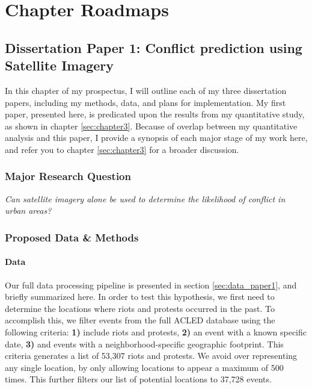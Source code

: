 
\chapter{Chapter Roadmaps} %


\label{Chapter4} %


\section{Dissertation Paper 1: Conflict prediction using Satellite Imagery}\label{sec:ch4_paper1}
In this chapter of my prospectus, I will outline each of my three dissertation papers, including my methods, data, and plans for implementation.  My first paper, presented here, is predicated upon the results from my quantitative study, as shown in chapter \ref{sec:chapter3}.  Because of overlap between my quantitative analysis and this paper, I provide a synopsis of each major stage of my work here, and refer you to chapter \ref{sec:chapter3} for a broader discussion.

\subsection{Major Research Question}
\textit{Can satellite imagery alone be used to determine the likelihood of conflict in urban areas?}

\subsection{Proposed Data \& Methods}
\subsubsection{Data}\label{sec:ch4_paper1_data}
Our full data processing pipeline is presented in section \ref{sec:data_paper1}, and briefly summarized here. In order to test this hypothesis, we first need to determine the locations where riots and protests occurred in the past. To accomplish this, we filter events from the full ACLED database using the following criteria: \textbf{1)} include riots and protests, \textbf{2)} an event with a known specific date, \textbf{3)} and events with a neighborhood-specific geographic footprint.  This criteria generates a list of 53,307 riots and protests.  We avoid over representing any single location, by only allowing locations to appear a maximum of 500 times.  This further filters our list of potential locations to 37,728 events.  

